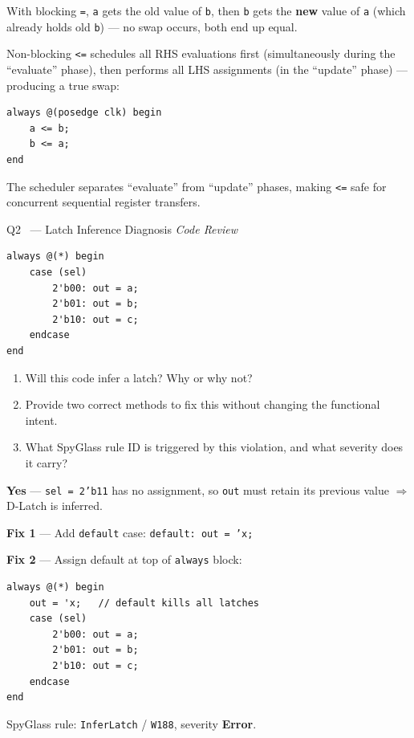 \documentclass[12pt,a4paper]{article}
\newcommand{\advanced}{%
  \fbox{\textcolor{advred}{\bfseries\sffamily\small ADVANCED}}}
\begin{document}
\begin{answerbox}
With blocking \texttt{=}, \texttt{a} gets the old value of \texttt{b}, then \texttt{b} gets the \textbf{new} value of \texttt{a} (which already holds old \texttt{b}) --- no swap occurs, both end up equal.

Non-blocking \texttt{<=} schedules all RHS evaluations first (simultaneously during the ``evaluate'' phase), then performs all LHS assignments (in the ``update'' phase) --- producing a true swap:
\begin{lstlisting}[style=verilogstyle]
always @(posedge clk) begin
    a <= b;
    b <= a;
end
\end{lstlisting}
The scheduler separates ``evaluate'' from ``update'' phases, making \texttt{<=} safe for concurrent sequential register transfers.
\end{answerbox}

\begin{questionbox}{Q2 \advanced\ --- Latch Inference Diagnosis \hfill\textit{Code Review}}

\begin{lstlisting}[style=verilogstyle]
always @(*) begin
    case (sel)
        2'b00: out = a;
        2'b01: out = b;
        2'b10: out = c;
    endcase
end
\end{lstlisting}

\begin{enumerate}[label=\textbf{\alph*)}]
  \item Will this code infer a latch? Why or why not?
  \item Provide two correct methods to fix this without changing the functional intent.
  \item What SpyGlass rule ID is triggered by this violation, and what severity does it carry?
\end{enumerate}
\end{questionbox}

\begin{answerbox}
\textbf{Yes} --- \texttt{sel = 2'b11} has no assignment, so \texttt{out} must retain its previous value $\Rightarrow$ D-Latch is inferred.

\textbf{Fix 1} --- Add \texttt{default} case: \texttt{default: out = 'x;}

\textbf{Fix 2} --- Assign default at top of \texttt{always} block:
\begin{lstlisting}[style=verilogstyle]
always @(*) begin
    out = 'x;   // default kills all latches
    case (sel)
        2'b00: out = a;
        2'b01: out = b;
        2'b10: out = c;
    endcase
end
\end{lstlisting}
SpyGlass rule: \texttt{InferLatch} / \texttt{W188}, severity \textbf{Error}.
\end{answerbox}
\end{document}

